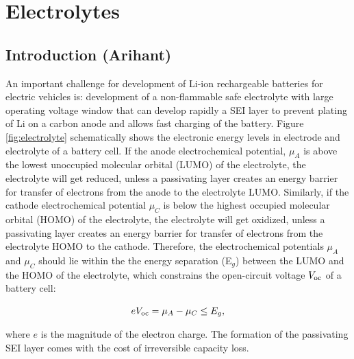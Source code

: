 \documentclass[../main.tex]{subfiles}
\begin{document}
\section{Electrolytes}
\label{sec:electrolytes}
\subsection{Introduction (Arihant)}%
\label{sec:introduction_electrolytes}
An important challenge for development of Li-ion rechargeable batteries for electric vehicles is: development of a non-flammable safe electrolyte with large operating voltage window that can develop rapidly a SEI layer to prevent plating of Li on a carbon anode and allows fast charging of the battery.\cite{Goodenough2010} Figure \ref{fig:electrolyte} schematically shows the electronic energy levels in electrode and electrolyte of a battery cell. If the anode electrochemical potential, $\mu_{A}$ is above the lowest unoccupied molecular orbital (LUMO) of the electrolyte, the electrolyte will get reduced, unless a passivating layer creates an energy barrier for transfer of electrons from the anode to the electrolyte LUMO. Similarly, if the cathode electrochemical potential $\mu_{C}$ is below the highest occupied molecular orbital (HOMO) of the electrolyte, the electrolyte will get oxidized, unless a passivating layer creates an energy barrier for transfer of electrons from the electrolyte HOMO to the cathode. Therefore, the electrochemical potentials $\mu_{A}$ and $\mu_{C}$ should lie within the the energy separation (E$_g$) between the LUMO and the HOMO of the electrolyte, which constrains the open-circuit voltage $V_{\rm oc}$ of a battery cell:

\begin{equation}
    eV_{\rm oc}=\mu_{A}-\mu_{C}\leq E_{g},
\end{equation}

where $e$ is the magnitude of the electron charge. %
The formation of the passivating SEI layer comes with the cost of irreversible capacity loss.
\end{document}
